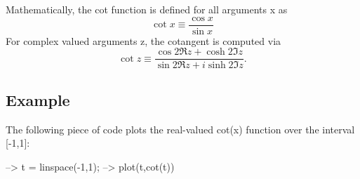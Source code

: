 Mathematically, the {\ttfamily cot} function is defined for all arguments {\ttfamily x} as \[ \cot x \equiv \frac{\cos x}{\sin x} \] For complex valued arguments {\ttfamily z}, the cotangent is computed via \[ \cot z \equiv \frac{\cos 2 \Re z + \cosh 2 \Im z}{\sin 2 \Re z + i \sinh 2 \Im z}. \] \hypertarget{variables_struct_Example}{}\subsection{Example}\label{variables_struct_Example}
The following piece of code plots the real-\/valued {\ttfamily cot(x)} function over the interval {\ttfamily \mbox{[}-\/1,1\mbox{]}}\-:


\begin{DoxyVerbInclude}
--> t = linspace(-1,1);
--> plot(t,cot(t))
\end{DoxyVerbInclude}



